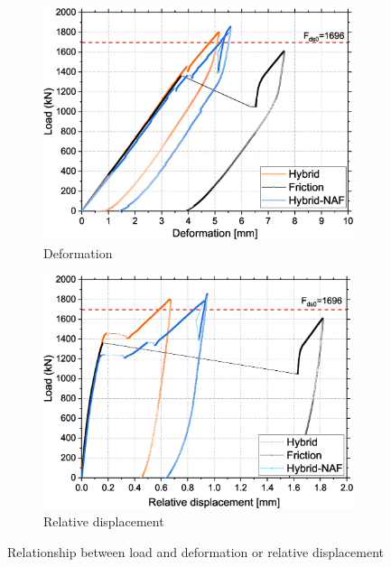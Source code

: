 \begin{figure}[htbp]
\centering
    \begin{subfigure}[t]{0.45\textwidth}
        \includegraphics[width=\linewidth]{imgs/ch6/load-disp-cor.eps}
        \caption{Deformation}
        \label{fig-loaddisp}
    \end{subfigure}
    \hfill
    \begin{subfigure}[t]{0.45\textwidth}
        \includegraphics[width=\linewidth]{imgs/ch6/RD-bolt10.eps}
        \caption{Relative displacement}
        \label{fig-rd10}
    \end{subfigure}
    \caption{Relationship between load and deformation or relative displacement}
    \label{fig-disp}
\end{figure}


